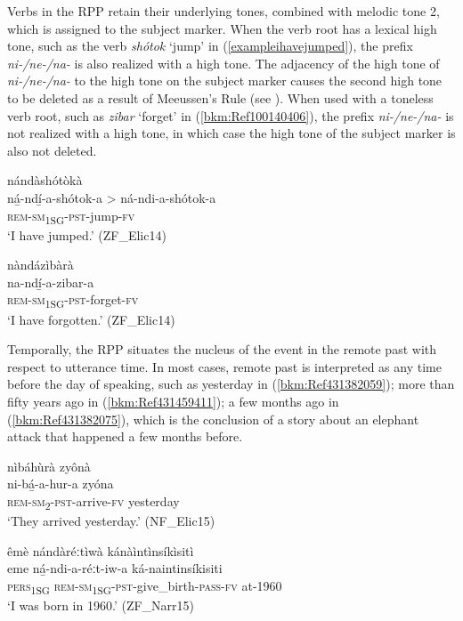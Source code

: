 Verbs in the RPP retain their underlying tones, combined with melodic tone 2, which is assigned to the subject marker. When the verb root has a lexical high tone, such as the verb \textit{shótok} ‘jump’ in (\ref{exampleihavejumped}), the prefix \textit{ni-/ne-/na-} is also realized with a high tone. The adjacency of the high tone of \textit{ni-/ne-/na-} to the high tone on the subject marker causes the second high tone to be deleted as a result of Meeussen’s Rule (see ). When used with a toneless verb root, such as \textit{zibar} ‘forget’ in (\ref{bkm:Ref100140406}), the prefix \textit{ni-/ne-/na-} is not realized with a high tone, in which case the high tone of the subject marker is also not deleted.

\ea
\label{exampleihavejumped}
\glll nándàshótòkà\\
ná̲-ndí̲-a-shótok-a > ná-ndi-a-shótok-a \\
\textsc{rem}-\textsc{sm}\textsubscript{1SG}-\textsc{pst}-jump-\textsc{fv}\\
\glt ‘I have jumped.’ (ZF\_Elic14)
\z

\ea
\label{bkm:Ref100140406}
\glll nàndázìbàrà\\
na-ndí̲-a-zibar-a\\
\textsc{rem}-\textsc{sm}\textsubscript{1SG}-\textsc{pst}-forget-\textsc{fv}\\
\glt ‘I have forgotten.’ (ZF\_Elic14)\label{bkm:Ref466391002}
\z

Temporally, the RPP situates the nucleus of the event in the remote past with respect to utterance time. In most cases, remote past is interpreted as any time before the day of speaking, such as yesterday in (\ref{bkm:Ref431382059}); more than fifty years ago in (\ref{bkm:Ref431459411}); a few months ago in (\ref{bkm:Ref431382075}), which is the conclusion of a story about an elephant attack that happened a few months before.

\ea
\label{bkm:Ref431382059}
nìbáhùrà zyônà\\
\gll ni-bá̲-a-hur-a    zyóna\\
\textsc{rem}-\textsc{sm}\textsubscript{2}-\textsc{pst}-arrive-\textsc{fv}  yesterday\\
\glt ‘They arrived yesterday.’ (NF\_Elic15)
\z

\ea
\label{bkm:Ref431459411}
êmè nándàréːtìwà kánàìntìnsíkìsitì\\
\gll eme    ná̲-ndi-a-réːt-iw-a        ká-naintinsíkisiti\\
\textsc{pers}\textsubscript{1SG}  \textsc{rem}-\textsc{sm}\textsubscript{1SG}-\textsc{pst}-give\_birth-\textsc{pass}-\textsc{fv}  at-1960\\
\glt ‘I was born in 1960.’ (ZF\_Narr15)
\z

